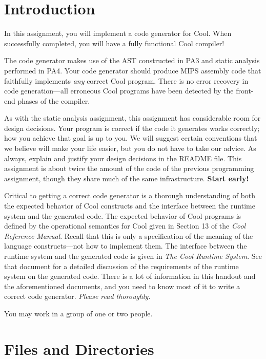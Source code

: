 \documentclass[11pt]{article}
\def\U#1{{\sf{}#1}}
\begin{document}


\section{Introduction}

In this assignment, you will implement a code generator for Cool.
When successfully completed, you will have a fully functional Cool
compiler!

The code generator makes use of the AST constructed in PA3 and static
analysis performed in PA4.  Your code generator should produce MIPS
assembly code that faithfully implements {\em any} correct Cool
program.  There is no error recovery in code generation---all
erroneous Cool programs have been detected by the front-end phases of
the compiler.

As with the static analysis assignment, this assignment has
considerable room for design decisions.  Your program is correct if
the code it generates works correctly; how you achieve that goal is up
to you.  We will suggest certain conventions that we believe will make
your life easier, but you do not have to take our advice.  As always,
explain and justify your design decisions in the \U{README} file.
This assignment is about twice the amount of the code of the previous
programming assignment, though they share much of the same
infrastructure. {\bf Start early!}

Critical to getting a correct code generator is a thorough
understanding of both the expected behavior of Cool constructs and the
interface between the runtime system and the generated code.  The
expected behavior of Cool programs is defined by the operational
semantics for Cool given in Section 13 of the \emph{Cool Reference
Manual}.  Recall that this is only a specification of the meaning of
the language constructs---not how to implement them.  The interface
between the runtime system and the generated code is given in
\emph{The Cool Runtime System}.  See that document for a detailed
discussion of the requirements of the runtime system on the generated
code.  There is a lot of information in this handout and the
aforementioned documents, and you need to know most of it to write a
correct code generator.  {\em Please read thoroughly.}

You may work in a group of one or two people.

\section{Files and Directories}
\end{document}
